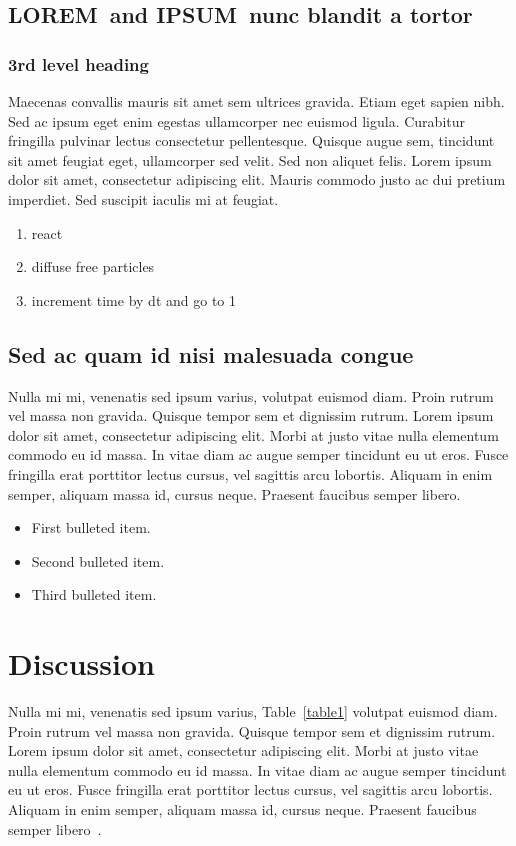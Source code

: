 \documentclass[10pt,letterpaper]{article}
\newcommand{\lorem}{{\bf LOREM}}
\newcommand{\ipsum}{{\bf IPSUM}}
\begin{document}
\subsection*{\lorem\ and \ipsum\ nunc blandit a tortor}
\subsubsection*{3rd level heading}
Maecenas convallis mauris sit amet sem ultrices gravida. Etiam eget sapien nibh. Sed ac ipsum eget enim egestas ullamcorper nec euismod ligula. Curabitur fringilla pulvinar lectus consectetur pellentesque. Quisque augue sem, tincidunt sit amet feugiat eget, ullamcorper sed velit. Sed non aliquet felis. Lorem ipsum dolor sit amet, consectetur adipiscing elit. Mauris commodo justo ac dui pretium imperdiet. Sed suscipit iaculis mi at feugiat.

\begin{enumerate}
	\item{react}
	\item{diffuse free particles}
	\item{increment time by dt and go to 1}
\end{enumerate}


\subsection*{Sed ac quam id nisi malesuada congue}

Nulla mi mi, venenatis sed ipsum varius, volutpat euismod diam. Proin rutrum vel massa non gravida. Quisque tempor sem et dignissim rutrum. Lorem ipsum dolor sit amet, consectetur adipiscing elit. Morbi at justo vitae nulla elementum commodo eu id massa. In vitae diam ac augue semper tincidunt eu ut eros. Fusce fringilla erat porttitor lectus cursus, vel sagittis arcu lobortis. Aliquam in enim semper, aliquam massa id, cursus neque. Praesent faucibus semper libero.

\begin{itemize}
	\item First bulleted item.
	\item Second bulleted item.
	\item Third bulleted item.
\end{itemize}

\section*{Discussion}
Nulla mi mi, venenatis sed ipsum varius, Table~\ref{table1} volutpat euismod diam. Proin rutrum vel massa non gravida. Quisque tempor sem et dignissim rutrum. Lorem ipsum dolor sit amet, consectetur adipiscing elit. Morbi at justo vitae nulla elementum commodo eu id massa. In vitae diam ac augue semper tincidunt eu ut eros. Fusce fringilla erat porttitor lectus cursus, vel sagittis arcu lobortis. Aliquam in enim semper, aliquam massa id, cursus neque. Praesent faucibus semper libero~\cite{bib3}.
\end{document}
